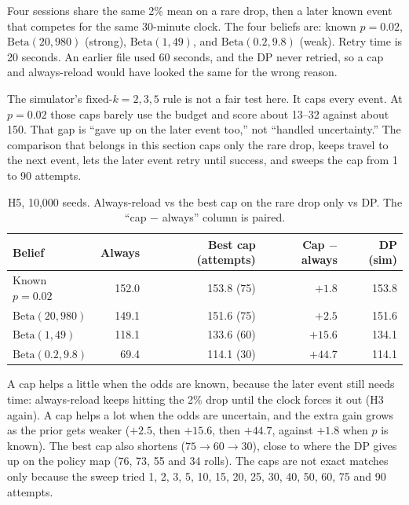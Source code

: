 \documentclass[11pt,a4paper]{article}
\begin{document}
Four sessions share the same 2\% mean on a rare drop, then a later known event that competes for the same 30-minute clock. The four beliefs are: known $p = 0.02$, $\mathrm{Beta}(20,980)$ (strong), $\mathrm{Beta}(1,49)$, and $\mathrm{Beta}(0.2,9.8)$ (weak). Retry time is 20 seconds. An earlier file used 60 seconds, and the DP never retried, so a cap and always-reload would have looked the same for the wrong reason.

The simulator's $\mathrm{fixed}\text{-}k = 2,3,5$ rule is not a fair test here. It caps every event. At $p = 0.02$ those caps barely use the budget and score about 13--32 against about 150. That gap is ``gave up on the later event too,'' not ``handled uncertainty.'' The comparison that belongs in this section caps only the rare drop, keeps travel to the next event, lets the later event retry until success, and sweeps the cap from 1 to 90 attempts.

\begin{table}[H]
\centering
\caption{H5, 10,000 seeds. Always-reload vs the best cap on the rare drop only vs DP. The ``cap $-$ always'' column is paired.}
\label{tab:H5}
\small
\begin{tabular}{@{}l r r r r@{}}
\toprule
\textbf{Belief} & \textbf{Always} & \textbf{Best cap (attempts)} & \textbf{Cap $-$ always} & \textbf{DP (sim)} \\
\midrule
Known $p = 0.02$     & 152.0 & 153.8 (75) & $+1.8$  & 153.8 \\
$\mathrm{Beta}(20,980)$ & 149.1 & 151.6 (75) & $+2.5$  & 151.6 \\
$\mathrm{Beta}(1,49)$   & 118.1 & 133.6 (60) & $+15.6$ & 134.1 \\
$\mathrm{Beta}(0.2,9.8)$& 69.4  & 114.1 (30) & $+44.7$ & 114.1 \\
\bottomrule
\end{tabular}
\end{table}

A cap helps a little when the odds are known, because the later event still needs time: always-reload keeps hitting the 2\% drop until the clock forces it out (H3 again). A cap helps a lot when the odds are uncertain, and the extra gain grows as the prior gets weaker ($+2.5$, then $+15.6$, then $+44.7$, against $+1.8$ when $p$ is known). The best cap also shortens ($75 \to 60 \to 30$), close to where the DP gives up on the policy map (76, 73, 55 and 34 rolls). The caps are not exact matches only because the sweep tried 1, 2, 3, 5, 10, 15, 20, 25, 30, 40, 50, 60, 75 and 90 attempts.
\end{document}
